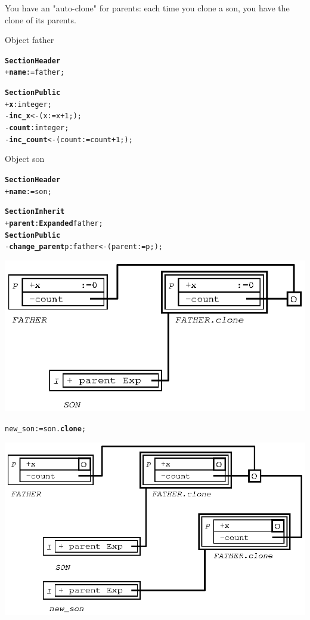 \documentclass[11pt]{mybook}
\begin{document}
You have an "auto-clone" for parents: each time you clone a son, you have the clone of its parents.
\begin{center}
Object {\sc{}father}
\end{center}
\begin{alltt} 
{\bf{}Section Header}
  + {\bf{}name}     := {\sc{}father};          

{\bf{}Section Public}
  + {\bf{}x}    :{\sc{}integer};
  - {\bf{}inc\_x} <- ( x := x + 1; );
  - {\bf{}count}:{\sc{}integer};
  - {\bf{}inc\_count} <- ( count := count + 1; );
\end{alltt}
\begin{center}
Object {\sc{}son}
\end{center}
\begin{alltt} 
{\bf{}Section Header}
  + {\bf{}name}     := {\sc{}son};          

{\bf{}Section Inherit}
  + {\bf{}parent}:{\bf{}Expanded} {\sc{}father};
{\bf{}Section Public}
  - {\bf{}change\_parent} p:{\sc{}father} <- ( parent := p; );
\end{alltt}
\begin{center}
\includegraphics[scale=1.0]{figures/inherit_expanded_0}
\end{center}

\begin{alltt}
  new\_son := {\sc{}son}.{\bf{}clone};
\end{alltt}
\begin{center}
\includegraphics[scale=1.0]{figures/inherit_expanded_1} 
\end{center}
\end{document}
